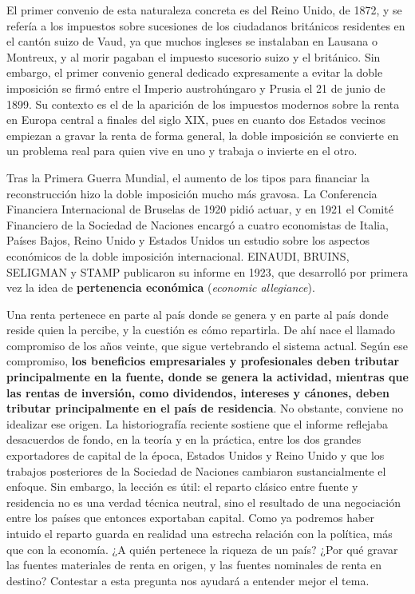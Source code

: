 \documentclass[10pt,a4paper]{article}
\begin{document}
El primer convenio de esta naturaleza concreta es del Reino Unido, de 1872, y se refería a los impuestos sobre sucesiones de los ciudadanos británicos residentes en el cantón suizo de Vaud, ya que muchos ingleses se instalaban en Lausana o Montreux, y al morir pagaban el impuesto sucesorio suizo y el británico. Sin embargo, el primer convenio general dedicado expresamente a evitar la doble imposición se firmó entre el Imperio austrohúngaro y Prusia el 21 de junio de 1899. Su contexto es el de la aparición de los impuestos modernos sobre la renta en Europa central a finales del siglo XIX, pues en cuanto dos Estados vecinos empiezan a gravar la renta de forma general, la doble imposición se convierte en un problema real para quien vive en uno y trabaja o invierte en el otro.

Tras la Primera Guerra Mundial, el aumento de los tipos para financiar la reconstrucción hizo la doble imposición mucho más gravosa. La Conferencia Financiera Internacional de Bruselas de 1920 pidió actuar, y en 1921 el Comité Financiero de la Sociedad de Naciones encargó a cuatro economistas de Italia, Países Bajos, Reino Unido y Estados Unidos un estudio sobre los aspectos económicos de la doble imposición internacional. EINAUDI, BRUINS, SELIGMAN y STAMP publicaron su informe en 1923, que desarrolló por primera vez la idea de \textbf{pertenencia económica} (\textit{economic allegiance}). 

Una renta pertenece en parte al país donde se genera y en parte al país donde reside quien la percibe, y la cuestión es cómo repartirla. De ahí nace el llamado compromiso de los años veinte, que sigue vertebrando el sistema actual. Según ese compromiso, \textbf{los beneficios empresariales y profesionales deben tributar principalmente en la fuente, donde se genera la actividad, mientras que las rentas de inversión, como dividendos, intereses y cánones, deben tributar principalmente en el país de residencia}. No obstante, conviene no idealizar ese origen. La historiografía reciente sostiene que el informe reflejaba desacuerdos de fondo, en la teoría y en la práctica, entre los dos grandes exportadores de capital de la época, Estados Unidos y Reino Unido y que los trabajos posteriores de la Sociedad de Naciones cambiaron sustancialmente el enfoque. Sin embargo, la lección es útil: el reparto clásico entre fuente y residencia no es una verdad técnica neutral, sino el resultado de una negociación entre los países que entonces exportaban capital. Como ya podremos haber intuido el reparto guarda en realidad una estrecha relación con la política, más que con la economía. ¿A quién pertenece la riqueza de un país? ¿Por qué gravar las fuentes materiales de renta en origen, y las fuentes nominales de renta en destino? Contestar a esta pregunta nos ayudará a entender mejor el tema.
\end{document}
